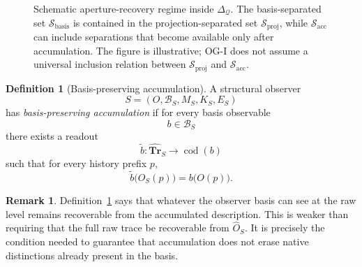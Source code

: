 \documentclass[11pt,twoside]{article}
\theoremstyle{definition}
\newtheorem{definition}[theorem]{Definition}
\newtheorem{remark}[theorem]{Remark}
\newcommand{\Tr}{\mathbf{Tr}}
\newcommand{\proj}{\mathrm{proj}}
\newcommand{\basis}{\mathrm{basis}}
\newcommand{\acc}{\mathrm{acc}}
\DeclareMathOperator{\cod}{cod}
\begin{document}
\begin{figure}[t]
\centering
{}
\caption{Schematic aperture-recovery regime inside \(\Delta_{\mathcal Q}\). The basis-separated set \(\mathcal S_{\basis}\) is contained in the projection-separated set \(\mathcal S_{\proj}\), while \(\mathcal S_{\acc}\) can include separations that become available only after accumulation. The figure is illustrative; OG-I does not assume a universal inclusion relation between \(\mathcal S_{\proj}\) and \(\mathcal S_{\acc}\).}
\label{fig:aperture-recovery-sets}
\end{figure}

\begin{definition}[Basis-preserving accumulation]
\label{def:basis-preserving-accumulation}
A structural observer
\[
  S=(O,\mathcal{B}_S,M_S,K_S,E_S)
\]
has \emph{basis-preserving accumulation} if for every basis observable
\[
  b \in \mathcal{B}_S
\]
there exists a readout
\[
  \widetilde{b} : \widehat{\Tr}_S \to \cod(b)
\]
such that for every history prefix \(p\),
\[
  \widetilde{b}\bigl(\widehat{O}_S(p)\bigr) = b\bigl(O(p)\bigr).
\]
\end{definition}

\begin{remark}
\label{rem:basis-preserving-accumulation}
Definition~\ref{def:basis-preserving-accumulation} says that whatever the observer basis can see at the raw level remains recoverable from the accumulated description. This is weaker than requiring that the full raw trace be recoverable from \(\widehat{O}_S\). It is precisely the condition needed to guarantee that accumulation does not erase native distinctions already present in the basis.
\end{remark}
\end{document}
